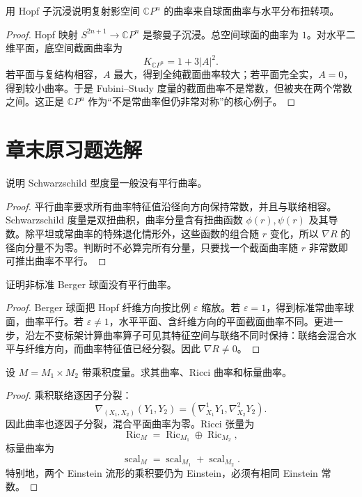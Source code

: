 \documentclass[11pt,a4paper,openany]{ctexbook}
\numberwithin{equation}{chapter}
\begin{document}
\begin{problem}
用 Hopf 子沉浸说明复射影空间 \(\mathbb CP^n\) 的曲率来自球面曲率与水平分布扭转项。
\end{problem}
\begin{proof}
Hopf 映射 \(S^{2n+1}\to\mathbb CP^n\) 是黎曼子沉浸。总空间球面的曲率为 \(1\)。对水平二维平面，底空间截面曲率为
\[
K_{\mathbb CP^n}=1+3|A|^2.
\]
若平面与复结构相容，\(A\) 最大，得到全纯截面曲率较大；若平面完全实，\(A=0\)，得到较小曲率。于是 Fubini--Study 度量的截面曲率不是常数，但被夹在两个常数之间。这正是 \(\mathbb CP^n\) 作为“不是常曲率但仍非常对称”的核心例子。
\end{proof}

\section{章末原习题选解}

\begin{problem}
说明 Schwarzschild 型度量一般没有平行曲率。
\end{problem}
\begin{proof}
平行曲率要求所有曲率特征值沿径向方向保持常数，并且与联络相容。Schwarzschild 度量是双扭曲积，曲率分量含有扭曲函数 \(\phi(r),\psi(r)\) 及其导数。除平坦或常曲率的特殊退化情形外，这些函数的组合随 \(r\) 变化，所以 \(\nabla R\) 的径向分量不为零。判断时不必算完所有分量，只要找一个截面曲率随 \(r\) 非常数即可推出曲率不平行。
\end{proof}

\begin{problem}
证明非标准 Berger 球面没有平行曲率。
\end{problem}
\begin{proof}
Berger 球面把 Hopf 纤维方向按比例 \(\varepsilon\) 缩放。若 \(\varepsilon=1\)，得到标准常曲率球面，曲率平行。若 \(\varepsilon\ne1\)，水平平面、含纤维方向的平面截面曲率不同。更进一步，沿左不变标架计算曲率算子可见其特征空间与联络不同时保持：联络会混合水平与纤维方向，而曲率特征值已经分裂。因此 \(\nabla R\ne0\)。
\end{proof}

\begin{problem}
设 \(M=M_1\times M_2\) 带乘积度量。求其曲率、Ricci 曲率和标量曲率。
\end{problem}
\begin{proof}
乘积联络逐因子分裂：
\[
\nabla_{(X_1,X_2)}(Y_1,Y_2)=(\nabla^1_{X_1}Y_1,\nabla^2_{X_2}Y_2).
\]
因此曲率也逐因子分裂，混合平面曲率为零。Ricci 张量为
\[
\operatorname{Ric}_M=\operatorname{Ric}_{M_1}\oplus\operatorname{Ric}_{M_2},
\]
标量曲率为
\[
\operatorname{scal}_M=\operatorname{scal}_{M_1}+\operatorname{scal}_{M_2}.
\]
特别地，两个 Einstein 流形的乘积要仍为 Einstein，必须有相同 Einstein 常数。
\end{proof}
\end{document}

